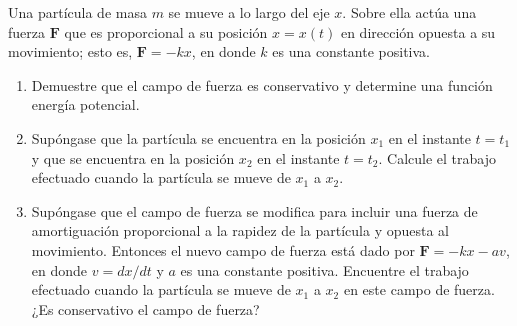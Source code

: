 \item Una partícula de masa $m$ se mueve a lo largo del eje $x$. Sobre ella actúa una fuerza $\mathbf{F}$ que es proporcional a su posición $x = x(t)$ en dirección opuesta a su movimiento; esto es, $\mathbf{F} = -kx$, en donde $k$ es una constante positiva.
    \begin{enumerate}
        \item[(a)] Demuestre que el campo de fuerza es conservativo y determine una función energía potencial.
        \item[(b)] Supóngase que la partícula se encuentra en la posición $x_1$ en el instante $t = t_1$ y que se encuentra en la posición $x_2$ en el instante $t = t_2$. Calcule el trabajo efectuado cuando la partícula se mueve de $x_1$ a $x_2$.
        \item[(c)] Supóngase que el campo de fuerza se modifica para incluir una fuerza de amortiguación proporcional a la rapidez de la partícula y opuesta al movimiento. Entonces el nuevo campo de fuerza está dado por $\mathbf{F} = -kx - av$, en donde $v = dx/dt$ y $a$ es una constante positiva. Encuentre el trabajo efectuado cuando la partícula se mueve de $x_1$ a $x_2$ en este campo de fuerza. ¿Es conservativo el campo de fuerza?
    \end{enumerate}
